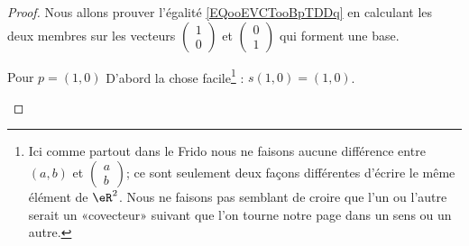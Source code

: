 \begin{proof}
	Nous allons prouver l'égalité \eqref{EQooEVCTooBpTDDq} en calculant les deux membres sur les vecteurs \( \begin{pmatrix}
		1 \\
		0
	\end{pmatrix}\) et \( \begin{pmatrix}
		0 \\
		1
	\end{pmatrix}\) qui forment une base.

	\begin{subproof}
		\item[Pour \( p=(1,0)\)]
		D'abord la chose facile\footnote{Ici comme partout dans le Frido nous ne faisons aucune différence entre \( (a,b)\) et \( \begin{pmatrix}
				a \\
				b
			\end{pmatrix}\); ce sont seulement deux façons différentes d'écrire le même élément de \( \eR^2\). Nous ne faisons pas semblant de croire que l'un ou l'autre serait un «covecteur» suivant que l'on tourne notre page dans un sens ou un autre.} : \( s(1,0)=(1,0)\).


\end{subproof}
\end{proof}
